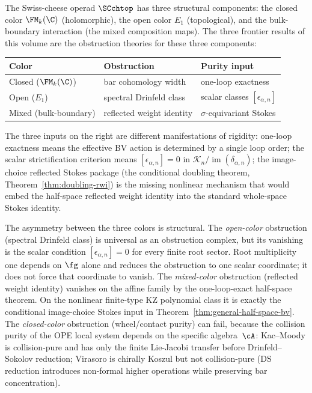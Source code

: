 \begin{remark}
\label{rem:three-colors-purity}
The Swiss-cheese operad $\SCchtop$ has three structural components:
the closed color $\FM_k(\C)$ (holomorphic), the open color $E_1$
(topological), and the bulk-boundary interaction (the mixed
composition maps). The three frontier results of this volume are the
obstruction theories for these three components:
\begin{center}
\begin{tabular}{lll}
\textbf{Color} & \textbf{Obstruction} & \textbf{Purity input} \\
\hline
Closed ($\FM_k(\C)$) & bar cohomology width & one-loop exactness \\
Open ($E_1$) & spectral Drinfeld class & scalar classes $[\epsilon_{\alpha,n}]$ \\
Mixed (bulk-boundary) & reflected weight identity & $\sigma$-equivariant Stokes
\end{tabular}
\end{center}
The three inputs on the right are different manifestations of
rigidity: one-loop exactness means the effective BV action is
determined by a single loop order; the scalar strictification
criterion means
$[\epsilon_{\alpha,n}]=0$ in
$\mathscr K_n/\operatorname{im}(\delta_{\alpha,n})$; the
image-choice reflected Stokes package (the
conditional doubling theorem, Theorem~\ref{thm:doubling-rwi}) is the
missing nonlinear mechanism that would embed the half-space reflected
weight identity into the standard whole-space Stokes identity.

The asymmetry between the three colors is structural.
The \emph{open-color} obstruction (spectral Drinfeld class) is
universal as an obstruction complex, but its vanishing is the scalar
condition
$[\epsilon_{\alpha,n}]=0$ for every finite root sector. Root
multiplicity one depends on $\fg$ alone and reduces the obstruction to
one scalar coordinate; it does not force that coordinate to vanish.
The \emph{mixed-color} obstruction (reflected weight identity) vanishes
on the affine family by the one-loop-exact half-space theorem. On the
nonlinear finite-type KZ polynomial class it is exactly the conditional
image-choice Stokes input in Theorem~\ref{thm:general-half-space-bv}.
The \emph{closed-color} obstruction (wheel/contact purity) can
fail, because the collision purity of the OPE local system
depends on the specific algebra~$\cA$: Kac--Moody is
collision-pure and has only the finite Lie-Jacobi transfer before
Drinfeld--Sokolov reduction; Virasoro
is chirally Koszul but not collision-pure (DS reduction introduces
non-formal higher operations while preserving bar concentration).


\end{remark}

